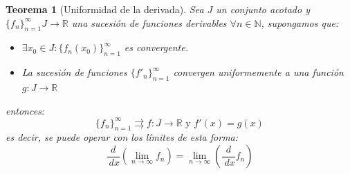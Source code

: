 \documentclass[10pt,a4paper,openright]{book}
\theoremstyle{break}
\newtheorem*{theo}{Teorema}
\newcommand{\dif}[1]{\ d#1}
\begin{document}
\begin{theo}[Uniformidad de la derivada]
Sea $J$ un conjunto acotado y $\{f_n\}_{n=1}^\infty J \rightarrow \mathbb{R}$ una sucesión de funciones derivables $\forall n \in \mathbb{N}$, supongamos que:
\begin{itemize}
\item $\exists x_0 \in J : \{f_n (x_0)\}_{n = 1}^\infty$ es convergente.

\item La sucesión de funciones $\{f'_n \}_{n = 1}^\infty$ convergen uniformemente a una función $g : J \to \mathbb{R}$
\end{itemize}
entonces:
$$\{f_n\}_{n=1}^\infty \rightrightarrows f: J \to \mathbb{R} \mbox{ y } f'(x) = g(x)$$
es decir, se puede operar con los límites de esta forma:
$$\frac{d}{\dif{x}} \left(\lim_{n \rightarrow \infty} f_n\right) = \lim_{n \rightarrow \infty} \left( \frac{d}{\dif{x}} f_n \right)$$
\end{theo}
\end{document}
